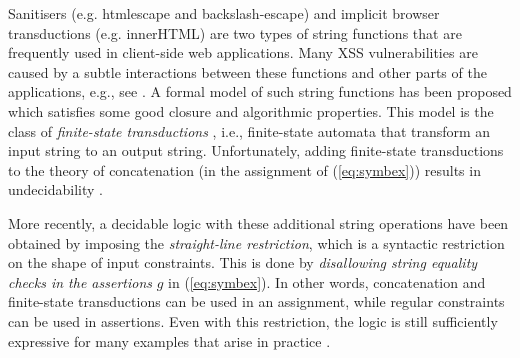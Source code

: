 
Sanitisers (e.g. htmlescape and backslash-escape)
and implicit browser transductions (e.g. innerHTML)
are two types of string functions that are frequently used in client-side
web applications. Many XSS vulnerabilities are caused by
a subtle interactions between these functions and other parts of the
applications, e.g., see \cite{web-model,Kern14,DV13,LB16,mXSS}. A formal 
model of such string functions has been proposed which satisfies some
good closure and algorithmic properties. This model is the class of
\emph{finite-state transductions}
\cite{BEK,web-model,DV13,symbolic-transducer,LB16}, i.e.,
finite-state automata that transform an input string to an output string. 
Unfortunately, adding finite-state transductions to
the theory of concatenation (in the assignment of (\ref{eq:symbex})) results in 
undecidability \cite{LB16}.



More recently, a decidable logic with these additional string 
operations \cite{LB16} have been obtained by imposing 
the \emph{straight-line restriction}, which is
a syntactic restriction on the shape of input constraints. This is done 
by \emph{disallowing string equality checks in the assertions} $g$ in 
(\ref{eq:symbex}). In other words, concatenation and finite-state transductions
can be used in an assignment, while regular constraints can be used in
assertions. Even with this restriction, the logic is still 
sufficiently expressive
for many examples that arise in practice \cite{LB16,HJLRV18}.

